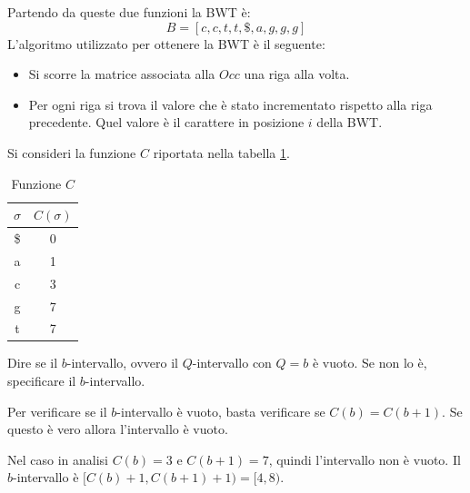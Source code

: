 \begin{esempio}
    Partendo da queste due funzioni la BWT è:
    \begin{equation}
        B = [c,c,t,t,\$,a,g,g,g]
    \end{equation}
    L'algoritmo utilizzato per ottenere la BWT è il seguente:
    \begin{itemize}
        \item Si scorre la matrice associata alla $Occ$ una riga alla volta.
        \item Per ogni riga si trova il valore che è stato incrementato rispetto
              alla riga precedente. Quel valore è il carattere in posizione $i$
              della BWT.
    \end{itemize}
\end{esempio}

\begin{esempio}
    Si consideri la funzione $C$ riportata nella tabella \ref{tab:esempioC}.
    \begin{table}[!ht]
        \centering
        \begin{tabular}{|c|c|}
            \hline
            \rowcolor[HTML]{EFEFEF}
            \textbf{$\sigma$} & \textbf{$C(\sigma)$} \\ \hline
            \$                & 0                    \\ \hline
            a                 & 1                    \\ \hline
            c                 & 3                    \\ \hline
            g                 & 7                    \\ \hline
            t                 & 7                    \\ \hline
        \end{tabular}
        \caption{Funzione $C$}
        \label{tab:esempioC}
    \end{table}
    Dire se il $b$-intervallo, ovvero il $Q$-intervallo con $Q = b$ è vuoto. Se
    non lo è, specificare il $b$-intervallo.

    Per verificare se il $b$-intervallo è vuoto, basta verificare se $C(b) =
        C(b + 1)$. Se questo è vero allora l'intervallo è vuoto.

    Nel caso in analisi $C(b) = 3$ e $C(b + 1) = 7$, quindi l'intervallo non è
    vuoto. Il $b$-intervallo è $[C(b) + 1, C(b + 1) + 1) = [4, 8)$.
\end{esempio}

